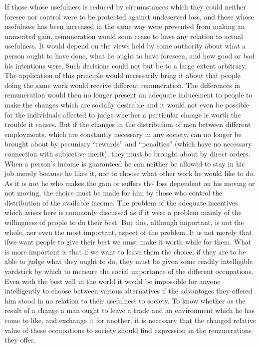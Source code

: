 \documentclass[11pt,openany]{book}
\begin{document}
If those whose usefulness is reduced by circumstances which they could neither foresee nor control were to be protected against undeserved loss, and those whose usefulness has been increased in the same way were prevented from making an unmerited gain, remuneration would soon cease to have any relation to actual usefulness. It would depend on the views held by some authority about what a person ought to have done, what he ought to have foreseen, and how good or bad his intentions were. Such decisions could not but be to a large extent arbitrary. The application of this principle would necessarily bring it about that people doing the same work would receive different remuneration. The differences in remuneration would then no longer present an adequate inducement to people to make the changes which are socially desirable and it would not even be possible for the individuals affected to judge whether a particular change is worth the trouble it causes. But if the changes in the distribution of men between different employments, which are constantly necessary in any society, can no longer be brought about by pecuniary ``rewards'' and ``penalties'' (which have no necessary connection with subjective merit), they must be brought about by direct orders. When a person's income is guaranteed he can neither be allowed to stay in his job merely because he likes it, nor to choose what other work he would like to do. As it is not he who makes the gain or suffers th\textasciitilde{} loss dependent on his moving or not moving, the choice must be made for him by those who control the distribution of the available income. The problem of the adequate incentives which arises here is commonly discussed as if it were a problem mainly of the willingness of people to do their best. But this, although important, is not the whole, nor even the most important, aspect of the problem. It is not merely that ifwe want people to give their best we must make it worth while for them. What is more important is that if we want to leave them the choice, if they are to be able to judge what they ought to do, they must be given some readily intelligible yardstick by which to measure the social importance of the different occupations. Even with the best will in the world it would be impossible for anyone intelligently to choose between various alternatives if the advantages they offered him stood in no relation to their usefulness to society. To know whether as the result of a change a man ought to leave a trade and an environment which he has come to like, and exchange it for another, it is necessary that the changed relative value of these occupations to society should find expression in the remunerations they offer.
\end{document}
